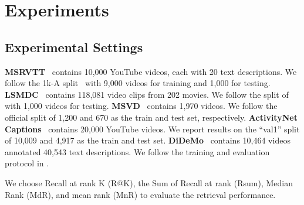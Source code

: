 \documentclass[10pt,twocolumn,letterpaper]{article}
\begin{document}
{\section{Experiments}
\subsection{Experimental Settings}
\textbf{MSRVTT}~\cite{xu2016msr} contains 10,000 YouTube videos, each with 20 text descriptions. We follow the 1k-A split~\cite{liu2019use} with 9,000 videos for training and 1,000 for testing. \textbf{LSMDC}~\cite{rohrbach2015a} contains 118,081 video clips from 202 movies. We follow the split of \cite{gabeur2020multi} with 1,000 videos for testing. \textbf{MSVD}~\cite{chen2011collecting} contains 1,970 videos. We follow the official split of 1,200 and 670 as the train and test set, respectively. \textbf{ActivityNet Captions}~\cite{krishna2017dense} contains 20,000 YouTube videos. We report results on the ``val1'' split of 10,009 and 4,917 as the train and test set. \textbf{DiDeMo}~\cite{anne2017localizing} contains 10,464 videos annotated 40,543 text descriptions. We follow the training and evaluation protocol in \cite{luo2021clip4clip}.

 We choose Recall at rank K (R@K), the Sum of Recall at rank  (Rsum), Median Rank (MdR), and mean rank (MnR) to evaluate the retrieval performance.

}
\end{document}
